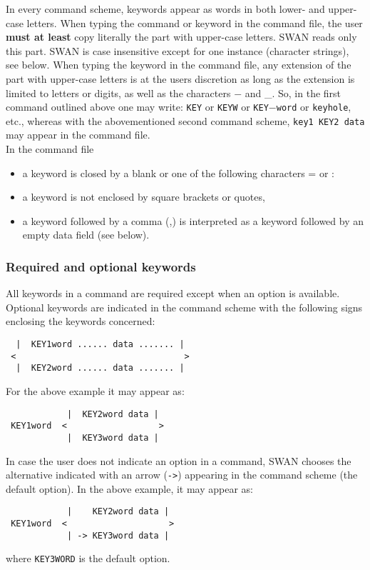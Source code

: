 \documentclass[12pt]{book}
\begin{document}
In every command scheme, keywords appear as words in both lower- and upper-case letters. When typing the command or
keyword in the command file, the user {\bf must at least} copy literally the part with upper-case letters. SWAN reads
only this part. SWAN is case insensitive except for one instance (character strings), see below. When typing the
keyword in the command file, any extension of the part with upper-case letters is at the users discretion as long as
the extension is limited to letters or digits, as well as the characters $-$ and \_. So, in the first command outlined
above one may write: {\tt KEY} or {\tt KEYW} or {\tt KEY}$-${\tt word} or {\tt keyhole}, etc., whereas with the
abovementioned second command scheme, {\tt key1 KEY2 data} may appear in the command file.
\\[2ex]
\noindent
In the command file
\begin{itemize}
  \item a keyword is closed by a blank or one of the following characters = or :
  \item a keyword is not enclosed by square brackets or quotes,
  \item a keyword followed by a comma (,) is interpreted as a keyword followed by an empty data field (see below).
\end{itemize}

\subsubsection{Required and optional keywords}

All keywords in a command are required except when an option is available.
\\[2ex]
\noindent
Optional keywords are indicated in the command scheme with the following signs enclosing the keywords concerned:
\begin{verbatim}
  |  KEY1word ...... data ....... |
 <                                 >
  |  KEY2word ...... data ....... |
\end{verbatim}
For the above example it may appear as:
\begin{verbatim}
            |  KEY2word data |
 KEY1word  <                  >
            |  KEY3word data |
\end{verbatim}
In case the user does not indicate an option in a command, SWAN chooses the alternative indicated with an arrow ({\tt ->})
appearing in the command scheme (the default option). In the above example, it may appear as:
\begin{verbatim}
            |    KEY2word data |
 KEY1word  <                    >
            | -> KEY3word data |
\end{verbatim}
where {\tt KEY3WORD} is the default option.
\end{document}
